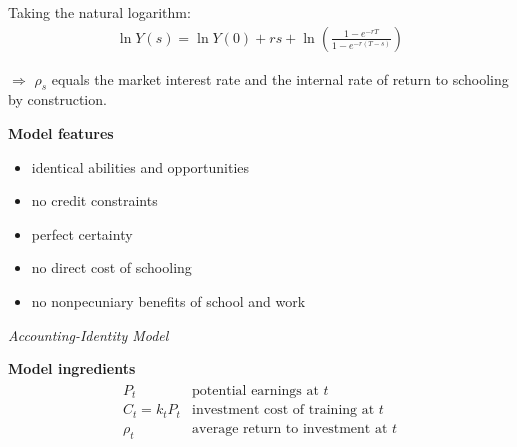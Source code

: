 \begin{frame}
Taking the natural logarithm:
\begin{align*}
\ln{Y(s)} = \ln{Y(0)} + r s + \ln{\left(\frac{1 - e^{-rT}}{1 - e^{-r(T - s)}}\right)}
\end{align*}

$\Rightarrow$ $\rho_s$ equals the market interest rate and the internal rate of return to schooling by construction.

\end{frame}
\begin{frame}\textbf{Model features}\vspace{0.3cm}
\begin{itemize}\setlength\itemsep{1em}
\item identical abilities and opportunities
\item no credit constraints
\item perfect certainty
\item no direct cost of schooling
\item no nonpecuniary benefits of school and work
\end{itemize}
\end{frame}
\begin{frame}\begin{center}
    \LARGE\textit{Accounting-Identity Model}
\end{center}\end{frame}
\begin{frame}\textbf{Model ingredients}
\begin{align*}\begin{array}{ll}
P_t & \text{potential earnings at $t$} \\
C_t = k_t P_t & \text{investment cost of training at $t$} \\
\rho_t & \text{average return to investment at $t$}
\end{array}\end{align*}
\end{frame}
